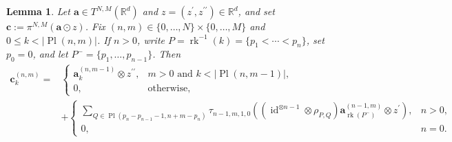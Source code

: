 \documentclass{amsart}
\newtheorem{lemma}[theorem]{Lemma}
\theoremstyle{definition}
\theoremstyle{remark}
\begin{document}
\begin{lemma}
\label{lem:ordered_shear_first_level_action}
Let
$\mathbf{a}\in T^{N,M}(\mathbb{R}^d)$ and
$z=(z^{\prime},z^{\prime\prime})\in\mathbb{R}^d$, and set
$\mathbf{c}:=\pi^{N,M}(\mathbf{a}\odot z)$.
Fix
$(n,m)\in\{0,\ldots,N\}\times\{0,\ldots,M\}$ and
$0\leq k<|\operatorname{Pl}(n,m)|$. If $n>0$, write
$P=\operatorname{rk}^{-1}(k)=\{p_1<\cdots<p_n\}$, set $p_0=0$, and let
$P^{-}=\{p_1,\ldots,p_{n-1}\}$.
Then
\[
\begin{aligned}
    \mathbf{c}^{(n,m)}_k
    ={}&
    \begin{cases}
        \mathbf{a}^{(n,m-1)}_k
        \otimes z^{\prime\prime},
        &
        m>0
        \text{ and }
        k<|\operatorname{Pl}(n,m-1)|,
        \\[0.3em]
        0,
        &
        \text{otherwise},
    \end{cases}
    \\
    &+
    \begin{cases}
        \displaystyle
        \sum_{Q\in
            \operatorname{Pl}
            \left(
                p_n-p_{n-1}-1,
                n+m-p_n
            \right)}
        \tau_{n-1,m,1,0}
        \left(
            \left(
                \operatorname{id}^{\otimes n-1}
                \otimes\rho_{P,Q}
            \right)
            \mathbf{a}^{(n-1,m)}_{\operatorname{rk}(P^{-})}
            \otimes z^{\prime}
        \right),
        &
        n>0,
        \\[1.2em]
        0,
        &
        n=0.
    \end{cases}
\end{aligned}
\]
\end{lemma}
\end{document}
